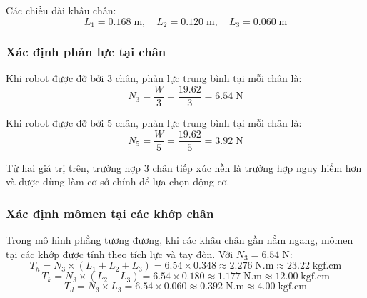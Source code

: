            \hspace{0.5cm} Các chiều dài khâu chân:
            \begin{equation}
                L_1 = 0.168\;\text{m}, \quad L_2 = 0.120\;\text{m}, \quad L_3 = 0.060\;\text{m}
            \end{equation}

            \subsubsection{Xác định phản lực tại chân}

            \hspace{0.5cm} Khi robot được đỡ bởi 3 chân, phản lực trung bình tại mỗi chân là:
            \begin{equation}
                N_3 = \frac{W}{3} = \frac{19.62}{3} = 6.54\;\text{N}
            \end{equation}

            \hspace{0.5cm} Khi robot được đỡ bởi 5 chân, phản lực trung bình tại mỗi chân là:
            \begin{equation}
                N_5 = \frac{W}{5} = \frac{19.62}{5} = 3.92\;\text{N}
            \end{equation}

            \hspace{0.5cm} Từ hai giá trị trên, trường hợp 3 chân tiếp xúc nền là trường hợp nguy hiểm hơn và được dùng làm cơ sở chính để lựa chọn động cơ.

            \subsubsection{Xác định mômen tại các khớp chân}

            \hspace{0.5cm} Trong mô hình phẳng tương đương, khi các khâu chân gần nằm ngang, mômen tại các khớp được tính theo tích lực và tay đòn. Với $N_3 = 6.54\;\text{N}$:
            \begin{equation}
                T_h = N_3 \times (L_1 + L_2 + L_3) = 6.54 \times 0.348 \approx 2.276\;\text{N.m} \approx 23.22\;\text{kgf.cm}
            \end{equation}
            \begin{equation}
                T_k = N_3 \times (L_2 + L_3) = 6.54 \times 0.180 \approx 1.177\;\text{N.m} \approx 12.00\;\text{kgf.cm}
            \end{equation}
            \begin{equation}
                T_d = N_3 \times L_3 = 6.54 \times 0.060 \approx 0.392\;\text{N.m} \approx 4.00\;\text{kgf.cm}
            \end{equation}

